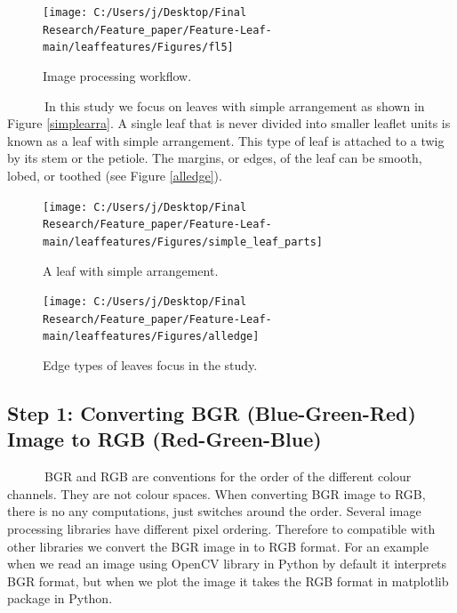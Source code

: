 \documentclass{article}
\begin{document}
\begin{figure}[!ht]

{\centering \texttt{[image: C:/Users/j/Desktop/Final Research/Feature\_paper/Feature-Leaf-main/leaffeatures/Figures/fl5]} 

}

\caption{\label{fig:test2}Image processing workflow.}\label{fig:unnamed-chunk-2}
\end{figure}

~~~~~~In this study we focus on leaves with simple arrangement as shown
in Figure \ref{simplearra}. A single leaf that is never divided into
smaller leaflet units is known as a leaf with simple arrangement. This
type of leaf is attached to a twig by its stem or the petiole. The
margins, or edges, of the leaf can be smooth, lobed, or toothed (see
Figure \ref{alledge}).

\begin{figure}[!ht]

{\centering \texttt{[image: C:/Users/j/Desktop/Final Research/Feature\_paper/Feature-Leaf-main/leaffeatures/Figures/simple\_leaf\_parts]} 

}

\caption{\label{simplearra} A leaf with simple arrangement.}\label{fig:unnamed-chunk-3}
\end{figure}

\begin{figure}[!ht]

{\centering \texttt{[image: C:/Users/j/Desktop/Final Research/Feature\_paper/Feature-Leaf-main/leaffeatures/Figures/alledge]} 

}

\caption{\label{alledge} Edge types of leaves focus in the study.}\label{fig:unnamed-chunk-4}
\end{figure}

\hypertarget{step-1-converting-bgr-blue-green-red-image-to-rgb-red-green-blue}{%
\subsection{Step 1: Converting BGR (Blue-Green-Red) Image to RGB
(Red-Green-Blue)}\label{step-1-converting-bgr-blue-green-red-image-to-rgb-red-green-blue}}

~~~~~~BGR and RGB are conventions for the order of the different colour
channels. They are not colour spaces. When converting BGR image to RGB,
there is no any computations, just switches around the order. Several
image processing libraries have different pixel ordering. Therefore to
compatible with other libraries we convert the BGR image in to RGB
format. For an example when we read an image using OpenCV library in
Python by default it interprets BGR format, but when we plot the image
it takes the RGB format in matplotlib package in Python.
\end{document}
